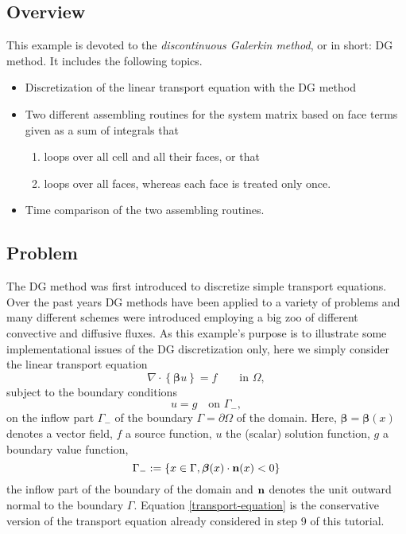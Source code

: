 \documentclass[11pt]{article}
\begin{document}
\subsection{Overview}
This example is devoted to the \emph{discontinuous Galerkin method}, or
in short: DG method. It includes the following topics.
\begin{itemize}
\item Discretization of the linear transport equation with the DG method
\item Two different assembling routines for the system matrix based on
  face terms given as a sum of integrals that
\begin{enumerate}
\item loops over all cell and all their faces, or that
\item loops over all faces, whereas each face is treated only once.
\end{enumerate}
\item Time comparison of the two assembling routines.
\end{itemize}

\subsection{Problem}
The DG method was first introduced to discretize simple transport
equations. Over the past years DG methods have been applied to a
variety of problems and many different schemes were introduced
employing a big zoo of different convective and diffusive fluxes.  As
this example's purpose is to illustrate some implementational issues
of the DG discretization only, here we simply consider the linear
transport equation
\begin{equation}\label{transport-equation}
  \nabla\cdot \left\{\boldsymbol\beta u\right\}=f  \qquad\mbox{in }\Omega,
\end{equation}
subject to the boundary conditions
\[
u=g\quad\mbox{on }\Gamma_-,
\]
on the inflow part $\Gamma_-$ of the boundary $\Gamma=\partial\Omega$
of the domain.  Here, $\boldsymbol\beta=\boldsymbol\beta(x)$ denotes a
vector field, $f$ a source function, $u$ the (scalar) solution
function, $g$ a boundary value function,
\[
\Gamma_-:=\{x\in\Gamma, \boldsymbol\beta(x)\cdot{\bf n}(x)<0\}
\]
the inflow part of the boundary of the domain and ${\bf n}$ denotes
the unit outward normal to the boundary $\Gamma$. Equation
\eqref{transport-equation} is the conservative version of the
transport equation already considered in step 9 of this tutorial.
\end{document}
